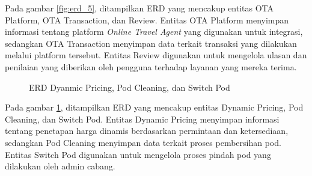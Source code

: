 Pada gambar \ref{fig:erd_5}, ditampilkan ERD yang mencakup entitas OTA Platform, OTA Transaction, dan Review. Entitas OTA Platform menyimpan informasi tentang platform \textit{Online Travel Agent} yang digunakan untuk integrasi, sedangkan OTA Transaction menyimpan data terkait transaksi yang dilakukan melalui platform tersebut. Entitas Review digunakan untuk mengelola ulasan dan penilaian yang diberikan oleh pengguna terhadap layanan yang mereka terima.

\begin{figure}[H] %
    \centering
    \caption{ERD Dyanmic Pricing, Pod Cleaning, dan Switch Pod }
    \label{fig:erd_6} %
\end{figure}

Pada gambar \ref{fig:erd_6}, ditampilkan ERD yang mencakup entitas Dynamic Pricing, Pod Cleaning, dan Switch Pod. Entitas Dynamic Pricing menyimpan informasi tentang penetapan harga dinamis berdasarkan permintaan dan ketersediaan, sedangkan Pod Cleaning menyimpan data terkait proses pembersihan pod. Entitas Switch Pod digunakan untuk mengelola proses pindah pod yang dilakukan oleh admin cabang.